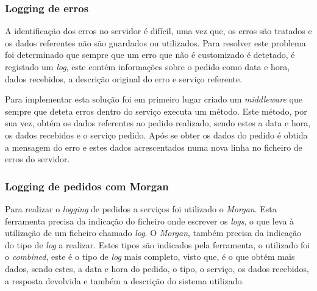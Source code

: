 \subsubsection{Logging de erros}

A identificação dos erros no servidor é difícil, uma vez que, os erros são tratados e os dados referentes não são guardados ou utilizados. Para resolver este problema foi determinado que sempre que um erro que não é customizado é detetado, é registado um \textit{log}, este contém informações sobre o pedido como data e hora, dados recebidos, a descrição original do erro e serviço referente.

Para implementar esta solução foi em primeiro lugar criado um \textit{middleware} que sempre que deteta erros dentro do serviço executa um método. Este método, por sua vez, obtém os dados referentes ao pedido realizado, sendo estes a data e hora, os dados recebidos e o serviço pedido. Após se obter os dados do pedido é obtida a mensagem do erro e estes dados acrescentados numa nova linha no ficheiro de erros do servidor.

\subsubsection{Logging de pedidos com Morgan}

Para realizar o \textit{logging} de pedidos a serviços foi utilizado o \textit{Morgan}. Esta ferramenta precisa da indicação do ficheiro onde escrever os \textit{logs}, o que leva à utilização de um ficheiro chamado \textit{log}. O \textit{Morgan}, também precisa da indicação do tipo de \textit{log} a realizar. Estes tipos são indicados pela ferramenta, o utilizado foi o \textit{combined}, este é o tipo de \textit{log} mais completo, visto que, é o que obtém mais dados, sendo estes, a data e hora do pedido, o tipo, o serviço, os dados recebidos, a resposta devolvida e também a descrição do sistema utilizado.